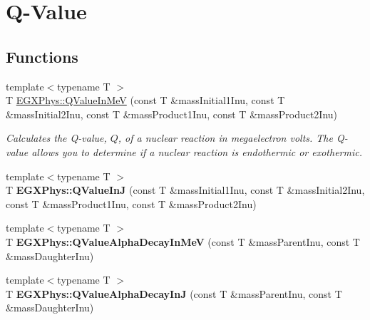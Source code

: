 \hypertarget{group___q_value}{}\section{Q-\/\+Value}
\label{group___q_value}
\subsection*{Functions}
\begin{DoxyCompactItemize}
\item 
{\footnotesize template$<$typename T $>$ }\\T \hyperlink{group___q_value_ga9de3868818a3548b4a4ab42f8c17278d}{E\+G\+X\+Phys\+::\+Q\+Value\+In\+MeV} (const T \&mass\+Initial1\+Inu, const T \&mass\+Initial2\+Inu, const T \&mass\+Product1\+Inu, const T \&mass\+Product2\+Inu)
\begin{DoxyCompactList}\small\item\em Calculates the Q-\/value, $Q$, of a nuclear reaction in megaelectron volts. The Q-\/value allows you to determine if a nuclear reaction is endothermic or exothermic. \end{DoxyCompactList}\item 
\mbox{\label{group___q_value_ga04e540785b9f7e4fb930160a3b1225af}} 
{\footnotesize template$<$typename T $>$ }\\T {\bfseries E\+G\+X\+Phys\+::\+Q\+Value\+InJ} (const T \&mass\+Initial1\+Inu, const T \&mass\+Initial2\+Inu, const T \&mass\+Product1\+Inu, const T \&mass\+Product2\+Inu)
\item 
\mbox{\label{group___q_value_ga18e054c21cd5f87744e9f5aadc959a54}} 
{\footnotesize template$<$typename T $>$ }\\T {\bfseries E\+G\+X\+Phys\+::\+Q\+Value\+Alpha\+Decay\+In\+MeV} (const T \&mass\+Parent\+Inu, const T \&mass\+Daughter\+Inu)
\item 
\mbox{\label{group___q_value_ga3e767be294dae24e1df18e7ccb8989e6}} 
{\footnotesize template$<$typename T $>$ }\\T {\bfseries E\+G\+X\+Phys\+::\+Q\+Value\+Alpha\+Decay\+InJ} (const T \&mass\+Parent\+Inu, const T \&mass\+Daughter\+Inu)
\item 
\mbox{\label{group___q_value_ga9bc6e8f493ee3769eb6eea0ac7cbdc61}} 

\end{DoxyCompactItemize}
